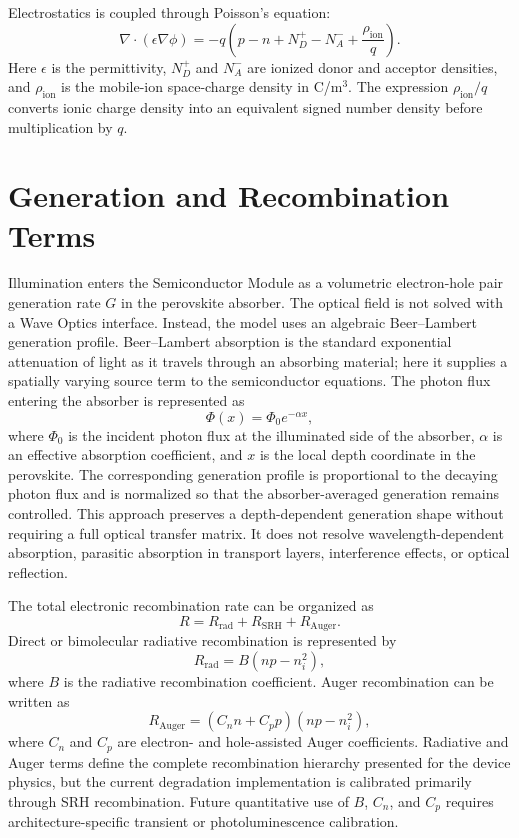 Electrostatics is coupled through Poisson's equation:
\begin{equation}
\nabla\cdot(\epsilon\nabla\phi)
= -q\left(p-n+N_D^+-N_A^-+\frac{\rho_{\mathrm{ion}}}{q}\right).
\label{eq:poisson}
\end{equation}
Here $\epsilon$ is the permittivity, $N_D^+$ and $N_A^-$ are ionized donor and
acceptor densities, and $\rho_{\mathrm{ion}}$ is the mobile-ion space-charge
density in C/m$^3$. The expression $\rho_{\mathrm{ion}}/q$ converts ionic
charge density into an equivalent signed number density before multiplication
by $q$.

\section{Generation and Recombination Terms}

Illumination enters the Semiconductor Module as a volumetric electron-hole pair
generation rate $G$ in the perovskite absorber. The optical field is not solved
with a Wave Optics interface. Instead, the model uses an algebraic
Beer--Lambert generation profile. Beer--Lambert absorption is the standard
exponential attenuation of light as it travels through an absorbing material;
here it supplies a spatially varying source term to the semiconductor
equations. The photon flux entering the absorber is
represented as
\begin{equation}
\Phi(x)=\Phi_0 e^{-\alpha x},
\end{equation}
where $\Phi_0$ is the incident photon flux at the illuminated side of the
absorber, $\alpha$ is an effective absorption coefficient, and $x$ is the local
depth coordinate in the perovskite. The corresponding generation profile is
proportional to the decaying photon flux and is normalized so that the
absorber-averaged generation remains controlled. This approach preserves a
depth-dependent generation shape without requiring a full optical transfer
matrix. It does not resolve wavelength-dependent absorption, parasitic
absorption in transport layers, interference effects, or optical reflection.

The total electronic recombination rate can be organized as
\begin{equation}
R = R_{\mathrm{rad}}+R_{\mathrm{SRH}}+R_{\mathrm{Auger}}.
\end{equation}
Direct or bimolecular radiative recombination is represented by
\begin{equation}
R_{\mathrm{rad}}=B\left(np-n_i^2\right),
\end{equation}
where $B$ is the radiative recombination coefficient. Auger recombination can
be written as
\begin{equation}
R_{\mathrm{Auger}}=
\left(C_n n+C_p p\right)\left(np-n_i^2\right),
\end{equation}
where $C_n$ and $C_p$ are electron- and hole-assisted Auger coefficients.
Radiative and Auger terms define the complete recombination hierarchy presented
for the device physics, but the current degradation implementation is
calibrated primarily through SRH recombination. Future quantitative use of
$B$, $C_n$, and $C_p$ requires architecture-specific transient or
photoluminescence calibration.

